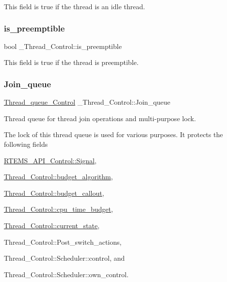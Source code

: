 This field is true if the thread is an idle thread. \mbox{\label{struct__Thread__Control_ac6b2f80121e8f2159365ff557415e1ff}} 
\subsubsection{\texorpdfstring{is\_preemptible}{is\_preemptible}}
{\footnotesize\ttfamily bool \+\_\+\+Thread\+\_\+\+Control\+::is\+\_\+preemptible}

This field is true if the thread is preemptible. \mbox{\label{struct__Thread__Control_a69f349249f56344621bf9a64b70bbfa9}} 
\subsubsection{\texorpdfstring{Join\_queue}{Join\_queue}}
{\footnotesize\ttfamily \mbox{\hyperlink{structThread__queue__Control}{Thread\+\_\+queue\+\_\+\+Control}} \+\_\+\+Thread\+\_\+\+Control\+::\+Join\+\_\+queue}



Thread queue for thread join operations and multi-\/purpose lock. 

The lock of this thread queue is used for various purposes. It protects the following fields


\begin{DoxyItemize}
\item \mbox{\hyperlink{structRTEMS__API__Control_ad6d6751bc70d36ca5f6e99b1d5a55cef}{R\+T\+E\+M\+S\+\_\+\+A\+P\+I\+\_\+\+Control\+::\+Signal}},
\item \mbox{\hyperlink{struct__Thread__Control_afd67f063faf8aa5ad9c5df575f9abcce}{Thread\+\_\+\+Control\+::budget\+\_\+algorithm}},
\item \mbox{\hyperlink{struct__Thread__Control_afbc0a87d1f48c8ff7beef11f640e63bb}{Thread\+\_\+\+Control\+::budget\+\_\+callout}},
\item \mbox{\hyperlink{struct__Thread__Control_a41df13f59c5389c807a3eed5013018b4}{Thread\+\_\+\+Control\+::cpu\+\_\+time\+\_\+budget}},
\item \mbox{\hyperlink{struct__Thread__Control_a537008b7050b384664cfb5b2b407facf}{Thread\+\_\+\+Control\+::current\+\_\+state}},
\item Thread\+\_\+\+Control\+::\+Post\+\_\+switch\+\_\+actions,
\item Thread\+\_\+\+Control\+::\+Scheduler\+::control, and
\item Thread\+\_\+\+Control\+::\+Scheduler\+::own\+\_\+control.
\end{DoxyItemize}

